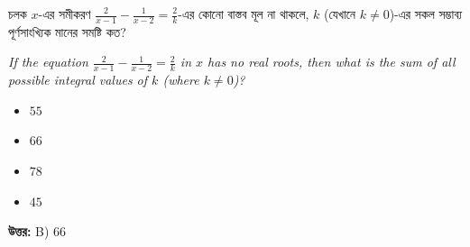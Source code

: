 \documentclass[12pt, a4paper]{article}
\begin{document}
\vspace{1.5em}

\begin{tcolorbox}[questionbox={প্রশ্ন (Question) 41}]
    \noindent
    চলক $x$-এর সমীকরণ $\frac{2}{x-1} - \frac{1}{x-2} = \frac{2}{k}$-এর কোনো বাস্তব মূল না থাকলে, $k$ (যেখানে $k \ne 0$)-এর সকল সম্ভাব্য পূর্ণসাংখ্যিক মানের সমষ্টি কত?
    
    \vspace{0.8em}
    \begin{english}
    \noindent\textit{\color{darkgray}
    If the equation $\frac{2}{x-1} - \frac{1}{x-2} = \frac{2}{k}$ in $x$ has no real roots, then what is the sum of all possible integral values of $k$ (where $k \ne 0$)?
    }
    \end{english}
\end{tcolorbox}

\begin{itemize}[label={}, leftmargin=1cm, itemsep=0.5em]
    \item[\textbf{A)}] $55$
    \item[\textbf{B)}] $66$
    \item[\textbf{C)}] $78$
    \item[\textbf{D)}] $45$
\end{itemize}

\vspace{0.5em}
\begin{tcolorbox}[answerbox]
    \textbf{\color{success} উত্তর:} B) $66$
\end{tcolorbox}
\vspace{1em}
\end{document}
